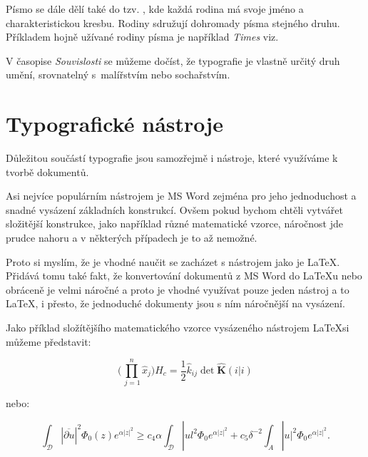 \documentclass[11pt,a4paper]{article}
\begin{document}
Písmo se dále dělí také do tzv. , kde každá rodina má svoje jméno a charakteristickou kresbu. Rodiny sdružují dohromady písma stejného druhu. Příkladem hojně užívané rodiny písma je například \textit{Times} viz\cite{Sirucek2006}.

V časopise \textit{Souvislosti}\cite{Souvislosti1999} se můžeme dočíst, že typografie je vlastně určitý druh umění, srovnatelný s~malířstvím nebo sochařstvím.

\section{Typografické nástroje}

Důležitou součástí typografie jsou samozřejmě i nástroje, které využíváme k tvorbě dokumentů. 

Asi nejvíce populárním nástrojem je MS Word zejména pro jeho jednoduchost a snadné vysázení základních konstrukcí. Ovšem pokud bychom chtěli vytvářet složitější konstrukce, jako například různé matematické vzorce, náročnost jde prudce nahoru a v některých případech je to až nemožné\cite{miktex}. 

Proto si myslím, že je vhodné naučit se zacházet s nástrojem jako je \LaTeX . Přidává tomu také fakt, že konvertování dokumentů z MS Word do \LaTeX u nebo obráceně je velmi náročné\cite{stone2017converting} a proto je vhodné využívat pouze jeden nástroj a to \LaTeX, i přesto, že jednoduché dokumenty jsou s ním náročnější na vysázení.

Jako příklad složítějšího matematického vzorce vysázeného nástrojem \LaTeX si můžeme představit\cite{Gratzer1996}:

$$
\biggl( \prod^n_{\, j = 1} \hat x_{j} \biggr) H_{c} =
\frac{1}{2} \hat k_{ij} \det \hat{ \mathbf{K} }(i|i)
$$

nebo:

$$
\int_{\mathcal{D}} | \overline{\partial u} |^{2}
\Phi_{0}(z) e^{\alpha |z|^2} \geq c_{4} \alpha \int_{\mathcal{D}} |ul^{2} \Phi_{0} e^{\alpha |z|^{2}} + c_{5} \delta^{-2} \int_{A} |u|^{2} \Phi_{0} e^{\alpha |z|^{2}}.
$$
    

\newpage
	
	\renewcommand{\refname}{Použitá literatura}
	
\end{document}
